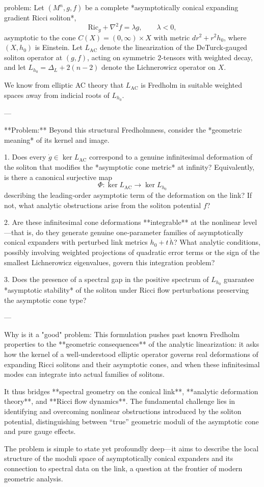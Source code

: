 problem:  
Let \((M^n,g,f)\) be a complete *asymptotically conical expanding gradient Ricci soliton*,  
\[
\mathrm{Ric}_g + \nabla^2 f = \lambda g, \qquad \lambda<0,
\]
asymptotic to the cone \(C(X)=(0,\infty)\times X\) with metric \(dr^2+r^2 h_0\), where \((X,h_0)\) is Einstein.  
Let \(L_\mathrm{AC}\) denote the linearization of the DeTurck‑gauged soliton operator at \((g,f)\), acting on symmetric \(2\)-tensors with weighted decay, and let \(L_{h_0}=\Delta_L+2(n-2)\) denote the Lichnerowicz operator on \(X\).

We know from elliptic AC theory that \(L_\mathrm{AC}\) is Fredholm in suitable weighted spaces away from indicial roots of \(L_{h_0}\).  

---

**Problem:**  
Beyond this structural Fredholmness, consider the *geometric meaning* of its kernel and image.

1. Does every \(\dot g\in\ker L_\mathrm{AC}\) correspond to a genuine infinitesimal deformation of the soliton that modifies the *asymptotic cone metric* at infinity?  
   Equivalently, is there a canonical surjective map
   \[
   \Phi : \ker L_\mathrm{AC} \longrightarrow \ker L_{h_0}
   \]
   describing the leading‐order asymptotic term of the deformation on the link?  If not, what analytic obstructions arise from the soliton potential \(f\)?

2. Are these infinitesimal cone deformations **integrable** at the nonlinear level—that is, do they generate genuine one‑parameter families of asymptotically conical expanders with perturbed link metrics \(h_0+t\,\dot h\)?  
   What analytic conditions, possibly involving weighted projections of quadratic error terms or the sign of the smallest Lichnerowicz eigenvalues, govern this integration problem?

3. Does the presence of a spectral gap in the positive spectrum of \(L_{h_0}\) guarantee *asymptotic stability* of the soliton under Ricci flow perturbations preserving the asymptotic cone type?

---

Why is it a "good" problem:  
This formulation pushes past known Fredholm properties to the **geometric consequences** of the analytic linearization: it asks how the kernel of a well‑understood elliptic operator governs real deformations of expanding Ricci solitons and their asymptotic cones, and when these infinitesimal modes can integrate into actual families of solitons.  

It thus bridges **spectral geometry on the conical link**, **analytic deformation theory**, and **Ricci flow dynamics**. The fundamental challenge lies in identifying and overcoming nonlinear obstructions introduced by the soliton potential, distinguishing between “true” geometric moduli of the asymptotic cone and pure gauge effects.  

The problem is simple to state yet profoundly deep—it aims to describe the local structure of the moduli space of asymptotically conical expanders and its connection to spectral data on the link, a question at the frontier of modern geometric analysis.